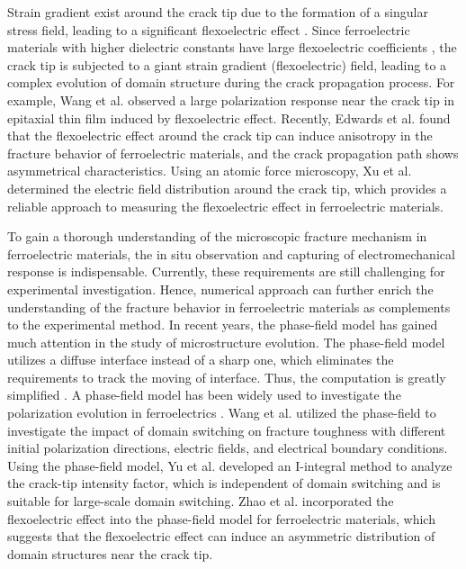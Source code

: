 \documentclass[final,times,fleqn,11pt]{elsarticle}
\begin{document}
Strain gradient exist around the crack tip due to the formation of a singular stress field, leading to a significant flexoelectric effect \cite{zubko_flexoelectric_2013,yudin_fundamentals_2013}. Since ferroelectric materials with higher dielectric constants have large flexoelectric coefficients \cite{ma_flexoelectricity_2006,hong_first-principles_2013}, the crack tip is subjected to a giant strain gradient (flexoelectric) field, leading to a complex evolution of domain structure during the crack propagation process. For example, Wang et al. \cite{wang_direct_2020} observed a large polarization response near the crack tip in  epitaxial thin film induced by flexoelectric effect. Recently, Edwards et al. \cite{cordero-edwards_flexoelectric_2019} found that the flexoelectric effect around the crack tip can induce anisotropy in the fracture behavior of ferroelectric materials, and the crack propagation path shows asymmetrical characteristics.  Using an atomic force microscopy, Xu et al. \cite{xu_directly_2023} determined the electric field distribution around the crack tip, which provides a reliable approach to measuring the flexoelectric effect in ferroelectric materials. 

To gain a thorough understanding of the microscopic fracture mechanism in ferroelectric materials, the in situ observation and capturing of electromechanical response is indispensable. Currently, these requirements are still challenging for experimental investigation. Hence, numerical approach can further enrich the understanding of the fracture behavior in ferroelectric materials as complements to the experimental method. In recent years, the phase-field model has gained much attention in the study of microstructure evolution. The phase-field model utilizes a diffuse interface instead of a sharp one, which eliminates the requirements to track the moving of interface. Thus, the computation is greatly simplified \cite{chen_phase-field_2002}. A phase-field model has been widely used to investigate the polarization evolution in ferroelectrics \cite{wang_phase-field_2004,su_continuum_2007,hong_stability_2017,yuan_defect-mediated_2018}. Wang et al. \cite{wang_phase_2007,wang_phase_2008,wang_three-dimensional_2009,wang_effect_2010} utilized the phase-field to investigate the impact of domain switching on fracture toughness with different initial polarization directions, electric fields, and electrical boundary conditions. Using the phase-field model, Yu \cite{yu_i-integral_2016} et al. developed an I-integral method to analyze the crack-tip intensity factor, which is independent of domain switching and is suitable for large-scale domain switching. Zhao et al. \cite{zhao_effect_2018} incorporated the flexoelectric effect into the phase-field model for ferroelectric materials, which suggests that the flexoelectric effect can induce an asymmetric distribution of domain structures near the crack tip.
\end{document}
